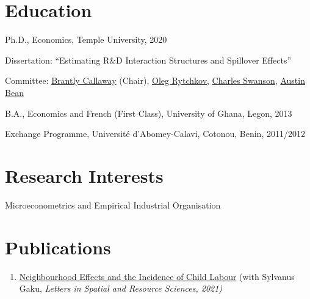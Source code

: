 \documentclass[12pt,letterpaper]{article}
\renewenvironment{itemize}{
  \begin{list}{}{
    \setlength{\leftmargin}{1.5em}
  }
}{
  \end{list}
}
\begin{document}
\section*{Education}

\begin{itemize}
  \item Ph.D., Economics, Temple University, 2020
  \begin{itemize}
    \item Dissertation: ``Estimating R\&D Interaction Structures and Spillover Effects''
    \item Committee:   \href{https://bcallaway11.github.io/index.html}
    {Brantly Callaway} (Chair), \href{https://astro.temple.edu/~rytchkov/}{Oleg Rytchkov}, \href{https://liberalarts.temple.edu/academics/faculty/swanson-charles}{Charles Swanson}, \href{https://liberalarts.temple.edu/academics/faculty/bean-austin}{Austin Bean} 
  \end{itemize}


  \item B.A., Economics and French (First Class), University of Ghana, Legon, 2013
  \item  Exchange Programme, Universit\'{e} d'Abomey-Calavi, Cotonou, Benin, 2011/2012
\end{itemize}

\section*{Research Interests}
\begin{itemize}
  \item Microeconometrics and Empirical Industrial Organisation
\end{itemize}

\section*{Publications}
\begin{enumerate}
	\item \href{https://link.springer.com/article/10.1007/s12076-021-00276-3}{Neighbourhood Effects and the Incidence of Child Labour} (with Sylvanus Gaku, \textit{Letters in Spatial and Resource Sciences, 2021)}
\end{enumerate}
\end{document}
